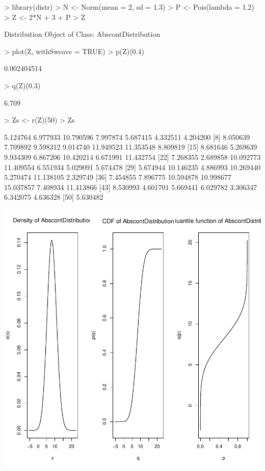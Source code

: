 \documentclass[11pt]{article}
\begin{document}
\begin{Schunk}
\begin{Sinput}
> library(distr)
> N <- Norm(mean = 2, sd = 1.3)
> P <- Pois(lambda = 1.2)
> Z <- 2*N + 3 + P
> Z
\end{Sinput}
\begin{Soutput}
Distribution Object of Class: AbscontDistribution
\end{Soutput}
\begin{Sinput}
> plot(Z, withSweave = TRUE)
> p(Z)(0.4)
\end{Sinput}
\begin{Soutput}
[1] 0.002404514
\end{Soutput}
\begin{Sinput}
> q(Z)(0.3)
\end{Sinput}
\begin{Soutput}
[1] 6.709
\end{Soutput}
\begin{Sinput}
> Zs <- r(Z)(50)
> Zs
\end{Sinput}
\begin{Soutput}
 [1]  5.124764  6.977933 10.790596  7.997874  5.687415  4.332511  4.204200
 [8]  8.050639  7.709892  9.598312  9.014740 11.949523 11.353548  8.809819
[15]  8.681646  5.269639  9.934309  6.867206 10.420214  6.671991 11.432754
[22]  7.268355  2.689858 10.092773 11.409554  6.551934  5.029091  5.674478
[29]  5.674944 10.146235  4.886993 10.269440  5.270474 11.138105  2.329749
[36]  7.454855  7.896775 10.594878 10.998677 15.037857  7.408934 11.413866
[43]  8.530993  4.601701  5.669441  6.029782  3.306347  6.342075  4.636328
[50]  5.630482
\end{Soutput}
\end{Schunk}
\includegraphics{distr-exam1}
\end{document}
